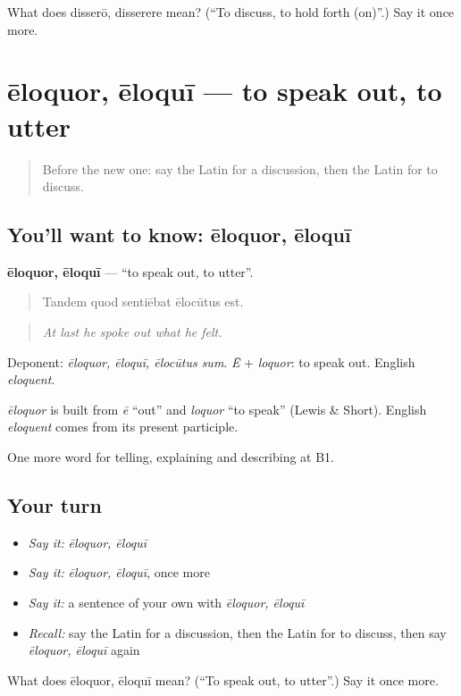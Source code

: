 \begin{tcolorbox}[breakable,colback=teal!4,colframe=teal!35!black,title={Before you move on}]
What does disserō, disserere mean? (\textquotedblleft{}To discuss, to hold forth (on)\textquotedblright{}.) Say it once more.
\end{tcolorbox}
\section[ēloquor, ēloquī]{ēloquor, ēloquī — to speak out, to utter}

\label{lesson:LA-C368-eloquor}



\begin{quote}
Before the new one: say the Latin for a discussion, then the Latin for to discuss.
\end{quote}

\subsection*{You'll want to know: ēloquor, ēloquī}
\textbf{ēloquor, ēloquī} — \textquotedblleft{}to speak out, to utter\textquotedblright{}.

\begin{quote}
Tandem quod sentiēbat ēlocūtus est.
\end{quote}

\begin{quote}
\emph{At last he spoke out what he felt.}
\end{quote}

Deponent: \emph{ēloquor, ēloquī, ēlocūtus sum}. \emph{Ē} + \emph{loquor}: to speak out. English \emph{eloquent}.

\begin{cousinweb}
\emph{ēloquor} is built from \emph{ē} \textquotedblleft{}out\textquotedblright{} and \emph{loquor} \textquotedblleft{}to speak\textquotedblright{} (Lewis \& Short). English \emph{eloquent} comes from its present participle.
\end{cousinweb}

\begin{grammarlens}[title={What you've built}]
One more word for telling, explaining and describing at B1.
\end{grammarlens}

\subsection*{Your turn}
\begin{itemize}
\raggedright
  \item \emph{Say it:} \emph{ēloquor, ēloquī}
  \item \emph{Say it:} \emph{ēloquor, ēloquī}, once more
  \item \emph{Say it:} a sentence of your own with \emph{ēloquor, ēloquī}
  \item \emph{Recall:} say the Latin for a discussion, then the Latin for to discuss, then say \emph{ēloquor, ēloquī} again
\end{itemize}

\begin{tcolorbox}[breakable,colback=teal!4,colframe=teal!35!black,title={Before you move on}]
What does ēloquor, ēloquī mean? (\textquotedblleft{}To speak out, to utter\textquotedblright{}.) Say it once more.
\end{tcolorbox}
